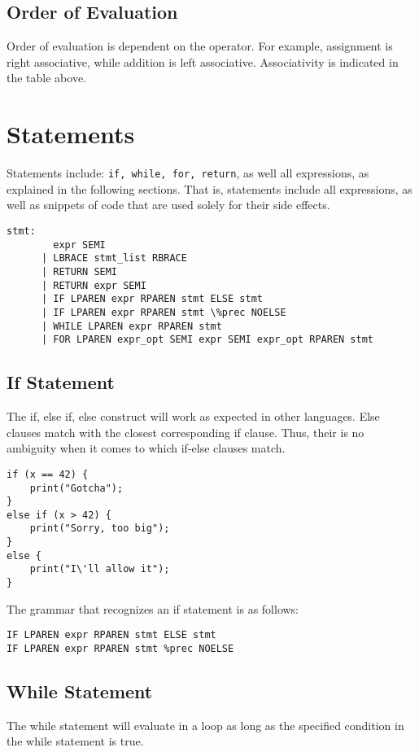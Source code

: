 \documentclass{article}
\begin{document}
\subsection{Order of Evaluation}
Order of evaluation is dependent on the operator. For example, assignment is right associative, while addition is left associative. Associativity is indicated in the table above.

\section{Statements}
Statements include: \texttt{if, while, for, return}, as well all expressions, as explained in the following sections. That is, statements include all expressions, as well as snippets of code that are used solely for their side effects.

\begin{Verbatim}[frame=single]
stmt:
	    expr SEMI 					
	  | LBRACE stmt_list RBRACE				
	  | RETURN SEMI					
	  | RETURN expr SEMI				 
	  | IF LPAREN expr RPAREN stmt ELSE stmt 	     
	  | IF LPAREN expr RPAREN stmt \%prec NOELSE 	     
	  | WHILE LPAREN expr RPAREN stmt 		   
  	  | FOR LPAREN expr_opt SEMI expr SEMI expr_opt RPAREN stmt 

\end{Verbatim}

\subsection{If Statement}
The if, else if, else construct will work as expected in other languages. Else clauses match with the closest corresponding if clause. Thus, their is no ambiguity when it comes to which if-else clauses match.

\begin{lstlisting}
if (x == 42) {
	print("Gotcha");
}
else if (x > 42) {
	print("Sorry, too big");
}
else {
	print("I\'ll allow it");
}
\end{lstlisting}

The grammar that recognizes an if statement is as follows:
\begin{Verbatim}[frame=single]
IF LPAREN expr RPAREN stmt ELSE stmt
IF LPAREN expr RPAREN stmt %prec NOELSE
\end{Verbatim}

\subsection{While Statement}
The while statement will evaluate in a loop as long as the specified condition in the while statement is true.
\end{document}
